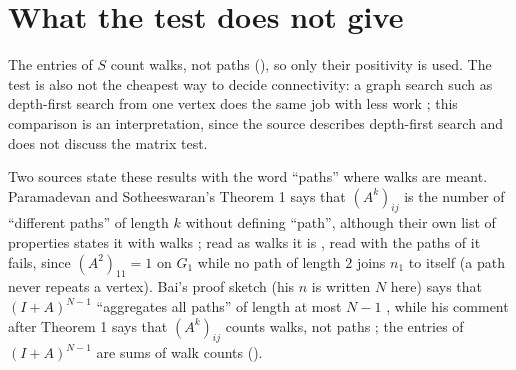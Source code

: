 \section{What the test does not give}\label{sec:limits}

The entries of $S$ count walks, not paths (), so only their positivity is used. The test is also not the cheapest way to decide connectivity: a graph search such as depth-first search from one vertex does the same job with less work \cite{wayne_cos226_undirected}; this comparison is an interpretation, since the source describes depth-first search and does not discuss the matrix test.

Two sources state these results with the word ``paths'' where walks are meant. Paramadevan and Sotheeswaran's Theorem 1 says that $(A^k)_{ij}$ is the number of ``different paths'' of length $k$ \cite[Theorem 1, p.~16]{paramadevan2021adjacency} without defining ``path'', although their own list of properties states it with walks \cite[Section 2.2, item 7, p.~16]{paramadevan2021adjacency}; read as walks it is , read with the paths of  it fails, since $(A^2)_{11} = 1$ on $G_1$ while no path of length $2$ joins $n_1$ to itself (a path never repeats a vertex). Bai's proof sketch (his $n$ is written $N$ here) says that $(I+A)^{N-1}$ ``aggregates all paths'' of length at most $N-1$ \cite[p.~2]{bai_bimsa_adjacency}, while his comment after Theorem 1 says that $(A^k)_{ij}$ counts walks, not paths \cite[p.~1]{bai_bimsa_adjacency}; the entries of $(I+A)^{N-1}$ are sums of walk counts ().
